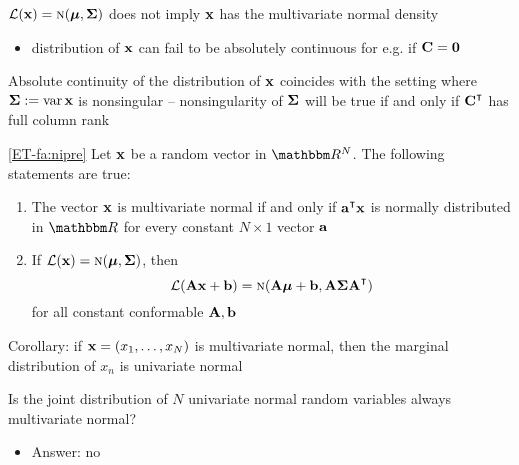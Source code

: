 \begin{frame}
    
    \vspace{2em}
   $\mathcal L({\mathbf x}) = \textrm{\sc n}({\boldsymbol \mu}, {\boldsymbol \Sigma})$ does not imply
    ${\mathbf x}$ has the multivariate normal density
    \begin{itemize}
        \item distribution of ${\mathbf x}$ can fail to be absolutely
            continuous for e.g. if $\mathbf C = {\mathbf 0}$ 
    \end{itemize}
    
    \vspace{1em}
    Absolute continuity of the distribution of ${\mathbf x}$ coincides with 
    the setting where ${\boldsymbol \Sigma} := \operatorname{var} {\mathbf x}$ is nonsingular -- 
    nonsingularity of ${\boldsymbol \Sigma}$ will be true if and only if
    $\boldC^\T$ has full column rank
    
\end{frame}

\begin{frame}
    
    \vspace{2em}
    \Fact\eqref{ET-fa:nipre}
    Let ${\mathbf x}$ be a random vector in $\RR^N$.  The following statements are true:
    \begin{enumerate}
        \item The vector ${\mathbf x}$ is multivariate normal  if and only if
            $\bolda^\T \boldx$ is normally distributed in $\RR$ for every
            constant $N \times 1$ vector ${\mathbf a}$
        \item If $\mathcal L({\mathbf x}) = \textrm{\sc n}({\boldsymbol \mu}, {\boldsymbol \Sigma})$, then 
            \begin{equation*}
                  \lL(\boldA \boldx + \boldb) = \nN(\boldA \boldmu + \boldb, \boldA
                    \boldSigma \boldA^\T)  
            \end{equation*}
            for all constant conformable $\mathbf A, {\mathbf b}$
    \end{enumerate}
    
\end{frame}

\begin{frame}

    \vspace{2em}
    Corollary: if ${\mathbf x} = (x_1,
    \ldots, x_N)$ is multivariate normal, then the marginal distribution of 
    $x_n$ is univariate normal
    
    Is the
    joint distribution of $N$ univariate normal random variables always
    multivariate normal? 
    \begin{itemize}
        \item Answer: no
    \end{itemize}
    
\end{frame}

